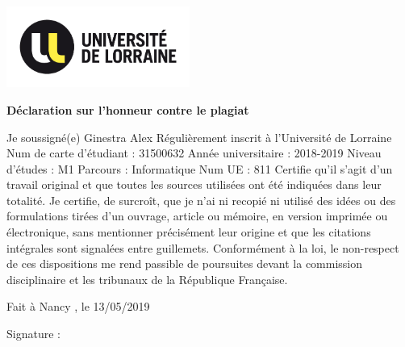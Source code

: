 \documentclass[11pt]{article}
\begin{document}
\cleardoublepage
\begin{flushleft}
\includegraphics[width=6cm]{UL_LOGO.jpg} %
\end{flushleft}

\vspace*{15mm}
\begin{center}
	{\bfseries \huge D\'{e}claration sur l'honneur contre le plagiat}
\end{center}
\vspace*{30mm}
Je soussign\'{e}(e) Ginestra Alex
\newline
R\'{e}guli\`{e}rement inscrit \`{a} l'Universit\'{e} de Lorraine
\newline
Num de carte d'\'{e}tudiant : 31500632
\newline
Ann\'{e}e universitaire : 2018-2019
\newline
Niveau d'\'{e}tudes : M1
\newline
Parcours : Informatique
\newline
Num UE : 811
\newline
\newline
Certifie qu'il s'agit d'un travail original et que toutes les sources utilis\'{e}es ont \'{e}t\'{e} indiqu\'{e}es dans leur totalit\'{e}. Je certifie, de surcro\^{i}t, que je n'ai ni recopi\'{e} ni utilis\'{e} des id\'{e}es ou des formulations tir\'{e}es d'un ouvrage, article ou m\'{e}moire, en version imprim\'{e}e ou \'{e}lectronique, sans mentionner pr\'{e}cis\'{e}ment leur origine et que les citations int\'{e}grales sont signal\'{e}es entre guillemets.
\newline
\newline
Conform\'{e}ment \`{a} la loi, le non-respect de ces dispositions me rend passible de poursuites devant la commission disciplinaire et les tribunaux de la R\'{e}publique Fran\c{c}aise.
\vspace*{20mm}
\begin{center}
Fait \`{a}  Nancy , le 13/05/2019
\end{center}
\vspace*{15mm}
\begin{flushright}
 Signature :  \,\,\,\,\,\,\,\,\,\,\,\,\,\,\,\,\,\,\,\,\,\,\,\,\,\,\,\,\,\,\,\,\,\,\,\,\,\,\,\,\,\,\,\,\,\,
\end{flushright}
\end{document}
